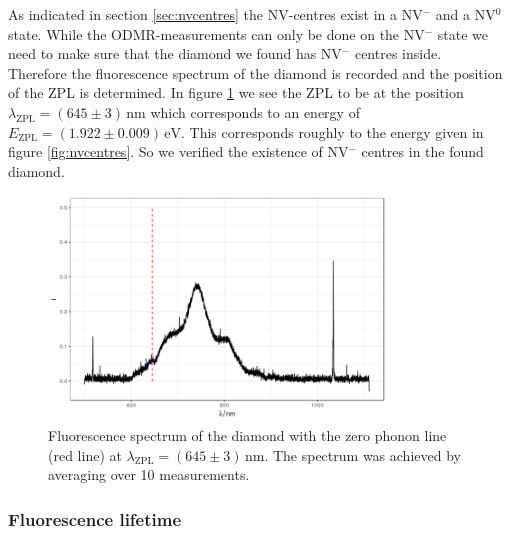 As indicated in section \ref{sec:nvcentres} the NV-centres exist in a NV$^-$ and a NV$^0$ state. While the ODMR-measurements can only be done on the NV$^-$ state we need to make sure that the diamond we found has NV$^-$ centres inside.\\

Therefore the fluorescence spectrum of the diamond is recorded and the position of the ZPL is determined. In figure \ref{fig:fluorescence} we see the ZPL to be at the position $\lambda_\text{ZPL}=(645\pm3)\,\mathrm{nm}$ which corresponds to an energy of $E_\text{ZPL}=(1.922\pm0.009)\,\mathrm{eV}$. This corresponds roughly to the energy given in figure \ref{fig:nvcentres}. So we verified the existence of NV$^-$ centres in the found diamond.
\begin{figure}
	\centering
	\includegraphics[width=0.8\textwidth]{../figures/fluorescence.png}
	\caption[Fluorescence spectrum of the diamond]{Fluorescence spectrum of the diamond with the zero phonon line (red line) at $\lambda_\text{ZPL}=(645\pm3)\,\mathrm{nm}$. The spectrum was achieved by averaging over 10 measurements.}
	\label{fig:fluorescence}
\end{figure}

\subsubsection{Fluorescence lifetime}

